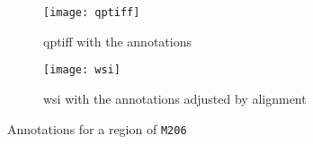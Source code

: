 \documentclass[12pt]{article}
\begin{document}
\begin{figure}
\centering
\begin{subfigure}{0.49\linewidth}
\texttt{[image: qptiff]}
\caption{qptiff with the annotations}
\end{subfigure}
\begin{subfigure}{0.49\linewidth}
\texttt{[image: wsi]}
\caption{wsi with the annotations adjusted by alignment}
\end{subfigure}
\caption{Annotations for a region of \texttt{M206}}
\end{figure}
\end{document}
